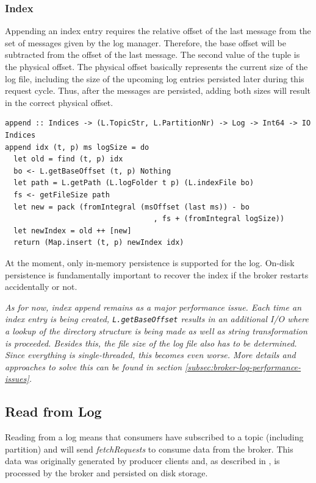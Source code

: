 \subsubsection{Index}

Appending an index entry requires the relative offset of the last message
from the set of messages given by the log manager. Therefore, the base
offset will be subtracted from the offset of the last message. The second value
of the tuple is the physical offset. The physical offset basically represents
the current size of the log file, including the size of the upcoming log
entries persisted later during this request cycle. Thus, after the messages are persisted, adding both sizes
will result in the correct physical offset.

\begin{lstlisting}[caption={Appending entry to index}]
append :: Indices -> (L.TopicStr, L.PartitionNr) -> Log -> Int64 -> IO Indices
append idx (t, p) ms logSize = do
  let old = find (t, p) idx
  bo <- L.getBaseOffset (t, p) Nothing 
  let path = L.getPath (L.logFolder t p) (L.indexFile bo)
  fs <- getFileSize path
  let new = pack (fromIntegral (msOffset (last ms)) - bo
                                  , fs + (fromIntegral logSize)) 
  let newIndex = old ++ [new]
  return (Map.insert (t, p) newIndex idx)
\end{lstlisting}

At the moment, only in-memory persistence is supported for the log. On-disk
persistence is fundamentally important to recover the index if the broker
restarts accidentally or not.

\textit{As for now, index append remains as a major performance issue. Each
  time an index entry is being created, \lstinline{L.getBaseOffset} results in
  an additional I/O where a lookup of the directory structure is being made as
  well as string transformation is proceeded. Besides this, the file size
of the log file also has to be determined. Since everything is
single-threaded, this becomes even worse. More details and approaches to solve this
can be found in section \ref{subsec:broker-log-performance-issues}.}


\subsection{Read from Log}
\label{subsec:broker-log-read}

Reading from a log means that consumers have subscribed to a topic (including
partition) and will send \textit{fetchRequests} to consume data from the broker.
This data was originally generated by producer clients and, as described in
\label{subsec:broker-log-append}, is processed by the broker and persisted on
disk storage.

